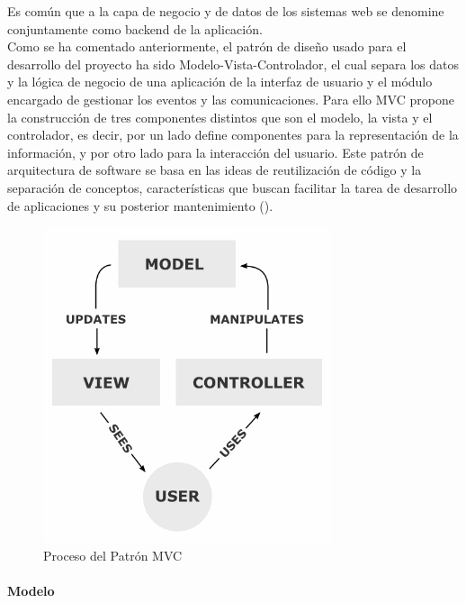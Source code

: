 Es común que a la capa de negocio y de datos de los sistemas web se denomine conjuntamente como backend de la aplicación.\\

Como se ha comentado anteriormente, el patrón de diseño usado para el desarrollo del proyecto ha sido Modelo-Vista-Controlador, el cual separa los datos y la lógica de negocio de una aplicación de la interfaz de usuario y el módulo encargado de gestionar los eventos y las comunicaciones. Para ello MVC propone la construcción de tres componentes distintos que son el modelo, la vista y el controlador, es decir, por un lado define componentes para la representación de la información, y por otro lado para la interacción del usuario.​ Este patrón de arquitectura de software se basa en las ideas de reutilización de código y la separación de conceptos, características que buscan facilitar la tarea de desarrollo de aplicaciones y su posterior mantenimiento (\cite{bib:wikipedia-modelo-vista-controlador}).

\vspace{10mm}

\begin{figure}[H]
\centering
  \includegraphics[scale=.55]{img/proceso-MVC.jpg}
  \caption{Proceso del Patrón MVC}
  \label{fig:proceso-MVC}
\end{figure}

\vspace{10mm}

\paragraph*{Modelo}

